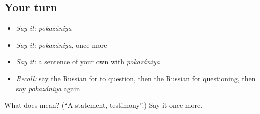 \subsection*{Your turn}
\begin{itemize}
\raggedright
  \item \emph{Say it:} \emph{pokazániya}
  \item \emph{Say it:} \emph{pokazániya}, once more
  \item \emph{Say it:} a sentence of your own with \emph{pokazániya}
  \item \emph{Recall:} say the Russian for to question, then the Russian for questioning, then say \emph{pokazániya} again
\end{itemize}

\begin{tcolorbox}[breakable,colback=teal!4,colframe=teal!35!black,title={Before you move on}]
What does  mean? (\textquotedblleft{}A statement, testimony\textquotedblright{}.) Say it once more.
\end{tcolorbox}
